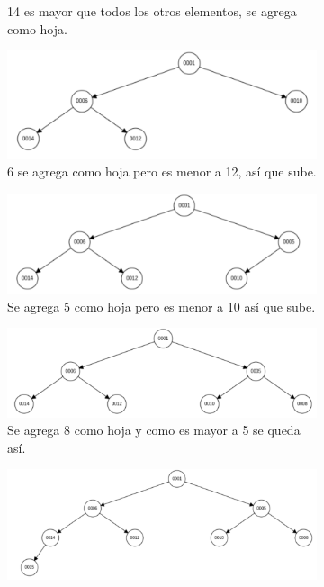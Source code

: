 \documentclass[12pt]{article}
\begin{document}
\begin{figure}
\begin{subfigure}{.6\textwidth}
		\caption{14 es mayor que todos los otros elementos, se agrega como hoja.}
		\label{fig:sfig4}
	\end{subfigure}
	\begin{subfigure}{.6\textwidth}
		\centering
		\includegraphics[width=1.04\linewidth]{hp005}
		\caption{6 se agrega como hoja pero es menor a 12, así que sube.}
		\label{fig:sfig5}
	\end{subfigure}
\begin{subfigure}{.6\textwidth}
	\centering
	\includegraphics[width=1.04\linewidth]{hp006}
	\caption{Se agrega 5 como hoja pero es menor a 10 así que sube.}
	\label{fig:sfig6}
\end{subfigure}
\begin{subfigure}{.6\textwidth}
	\centering
	\includegraphics[width=1.04\linewidth]{hp007}
	\caption{Se agrega 8 como hoja y como es mayor a 5 se queda así.}
	\label{fig:sfig7}
\end{subfigure}
\begin{subfigure}{.6\textwidth}
	\centering
	\includegraphics[width=0.95\linewidth]{hp008}

\end{subfigure}
\end{figure}
\end{document}
